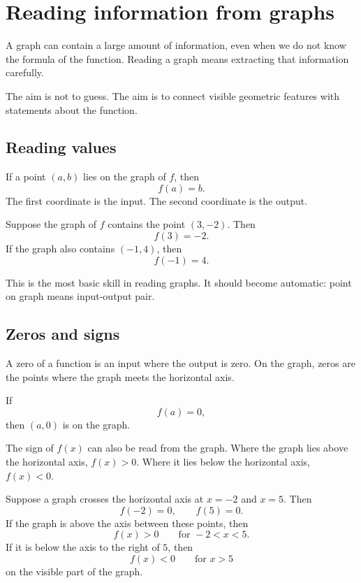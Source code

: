 \section{Reading information from graphs}

A graph can contain a large amount of information, even when we do not know the formula of the function. Reading a graph means extracting that information carefully.

The aim is not to guess. The aim is to connect visible geometric features with statements about the function.

\subsection*{Reading values}

If a point \((a,b)\) lies on the graph of \(f\), then
\[
f(a)=b.
\]
The first coordinate is the input. The second coordinate is the output.

\begin{examplebox}
Suppose the graph of \(f\) contains the point \((3,-2)\). Then
\[
f(3)=-2.
\]
If the graph also contains \((-1,4)\), then
\[
f(-1)=4.
\]
\end{examplebox}

This is the most basic skill in reading graphs. It should become automatic: point on graph means input-output pair.

\subsection*{Zeros and signs}

A zero of a function is an input where the output is zero. On the graph, zeros are the points where the graph meets the horizontal axis.

If
\[
f(a)=0,
\]
then \((a,0)\) is on the graph.

The sign of \(f(x)\) can also be read from the graph. Where the graph lies above the horizontal axis, \(f(x)>0\). Where it lies below the horizontal axis, \(f(x)<0\).

\begin{examplebox}
Suppose a graph crosses the horizontal axis at \(x=-2\) and \(x=5\). Then
\[
f(-2)=0,
\qquad
f(5)=0.
\]
If the graph is above the axis between these points, then
\[
f(x)>0
\qquad\text{for } -2<x<5.
\]
If it is below the axis to the right of \(5\), then
\[
f(x)<0
\qquad\text{for } x>5
\]
on the visible part of the graph.
\end{examplebox}

